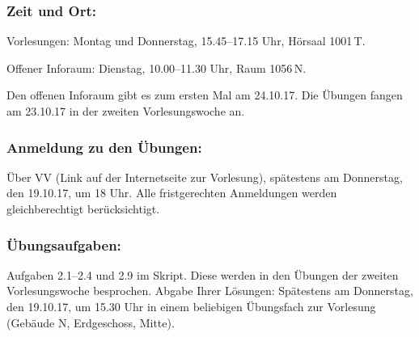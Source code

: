 {}

\subsubsection{Zeit und Ort:}

Vorlesungen: Montag und Donnerstag, 15.45--17.15 Uhr,
H\"orsaal 1001$\,$T.


\noindent
Offener Inforaum: Dienstag, 10.00--11.30 Uhr,
Raum 1056$\,$N.

\smallskip
\noindent
Den offenen Inforaum gibt es zum ersten
Mal am 24.10.17.
Die \"Ubungen
fangen am 23.10.17 in der zweiten Vorlesungswoche an.

\subsubsection*{Anmeldung zu den \"Ubungen:}
\"Uber VV (Link auf der Internetseite zur Vorlesung),
sp\"atestens am Donnerstag, den 19.10.17, um
18 Uhr.
Alle fristgerechten Anmeldungen werden
gleichberechtigt ber\"ucksichtigt.

\subsubsection{\"Ubungsaufgaben:}
Aufgaben 2.1--2.4
und 2.9 im Skript.
Diese werden in den \"Ubungen der
zweiten Vorlesungswoche besprochen.
Abgabe Ihrer L\"osungen:
Sp\"atestens am Donnerstag, den 19.10.17,
um 15.30 Uhr in einem beliebigen \"Ubungsfach
zur Vorlesung (Geb\"aude N, Erdgeschoss, Mitte).
